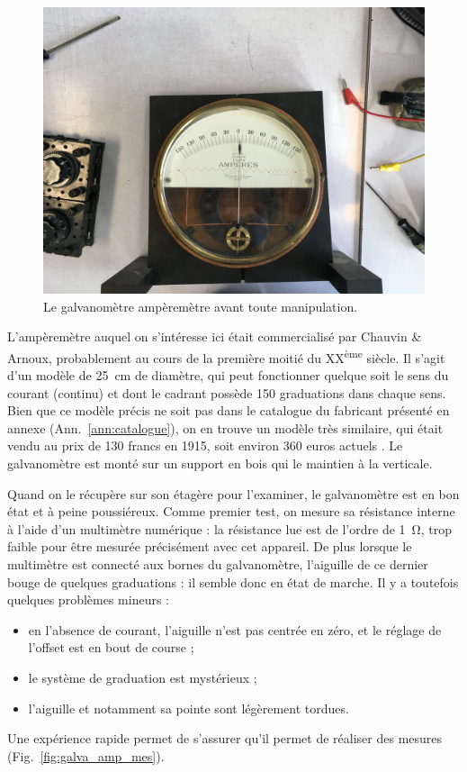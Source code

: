 \documentclass[12pt,a4paper,fleqn]{article}
\begin{document}
\begin{figure}[htbp]
    \center
    \includegraphics[height=300 pt, trim=800 0 700 800, clip]{images/IMG_4012.JPG}
    \caption{Le galvanomètre ampèremètre avant toute manipulation.}
    \label{fig:galva_amp_av}
\end{figure}

L'ampèremètre auquel on s'intéresse ici était commercialisé par Chauvin \& Arnoux, probablement au cours de la première moitié du XX\textsuperscript{ème} siècle.
Il s'agit d'un modèle de \SI{25}{cm} de diamètre, qui peut fonctionner quelque soit le sens du courant (continu) et dont le cadrant possède 150 graduations dans chaque sens.
Bien que ce modèle précis ne soit pas dans le catalogue du fabricant présenté en annexe (Ann.~\ref{ann:catalogue}), on en trouve un modèle très similaire, qui était vendu au prix de 130 francs en 1915, soit environ 360 euros actuels \cite{Alexandre2014}.
Le galvanomètre est monté sur un support en bois qui le maintien à la verticale.

Quand on le récupère sur son étagère pour l'examiner, le galvanomètre est en bon état et à peine poussiéreux.
Comme premier test, on mesure sa résistance interne à l'aide d'un multimètre numérique : la résistance lue est de l'ordre de \SI{1}{\ohm}, trop faible pour être mesurée précisément avec cet appareil.
De plus lorsque le multimètre est connecté aux bornes du galvanomètre, l'aiguille de ce dernier bouge de quelques graduations : il semble donc en état de marche.
Il y a toutefois quelques problèmes mineurs :
\begin{itemize}
    \item en l'absence de courant, l'aiguille n'est pas centrée en zéro, et le réglage de l'\og offset \fg{} est en bout de course ;
    \item le système de graduation est mystérieux ;
    \item l'aiguille et notamment sa pointe sont légèrement tordues.
\end{itemize}
Une expérience rapide permet de s'assurer qu'il permet de réaliser des mesures (Fig.~\ref{fig:galva_amp_mes}).
\end{document}
